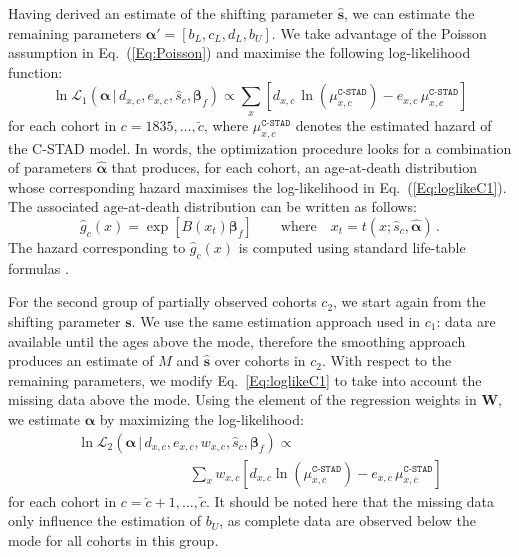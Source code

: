 \documentclass[11pt, a4paper]{article}
\begin{document}
Having derived an estimate of the shifting parameter $\hat{\bm{s}}$, we can estimate the remaining parameters $\bm{\alpha}'=\left[b_{L},c_{L},d_{L},b_{U}\right]$. We take advantage of the Poisson assumption in Eq.~(\ref{Eq:Poisson}) and maximise the following log-likelihood function:
%
\begin{equation}\label{Eq:loglikeC1}
\ln\mathcal{L}_1\left(\bm{\alpha}\,|\,d_{x,c} , e_{x,c} , \hat{s}_{c}, \bm{\beta}_{f}
\right) \propto \sum_{x} \left[  d_{x,c} \,
\ln \left( \mu^{\texttt{C-STAD}}_{x,c}  \right) - e_{x,c}
\, \mu^{\texttt{C-STAD}}_{x,c} \right] 
\end{equation}
%
for each cohort in $c = 1835,\ldots,\breve{c}$, where $\mu^{\texttt{C-STAD}}_{x,c}$ denotes the estimated hazard of the C-STAD model. In words, the optimization procedure looks for a combination of parameters $\hat{\bm{\alpha}}$ that produces, for each cohort, an age-at-death distribution
whose corresponding hazard maximises the log-likelihood in Eq.~(\ref{Eq:loglikeC1}). The associated age-at-death distribution can be written as follows:
\begin{equation}\label{eq:gBspl}
\hat{g}_{c}(x) = \exp\left[ B(x_{t}) \bm{\beta}_{f} \right] \qquad \mbox{where} \quad x_{t} = t(x; \hat{s}_{c},\hat{\bm{\alpha}}) \, .
\end{equation}
The hazard corresponding to $\hat{g}_{c}(x)$ is computed using standard life-table formulas \citep{preston2001demogr}.

For the second group of partially observed cohorts $c_2$, we start again from the shifting parameter $\bm{s}$. We use the same estimation approach used in $c_1$: data are available until the ages above the mode, therefore the smoothing approach produces an estimate of $M$ and $\hat{\bm{s}}$ over cohorts in $c_2$. With respect to the remaining parameters, we modify Eq.~\eqref{Eq:loglikeC1} to take into account the missing data above the mode. Using the element of the regression weights in $\bm{W}$, we estimate $\bm{\alpha}$ by maximizing the log-likelihood:
%
\begin{equation}\label{Eq:loglikeC2}
\begin{aligned}
\ln\mathcal{L}_2\left(\bm{\alpha}\,|\,d_{x,c} , e_{x,c} , w_{x,c} , \hat{s}_{c}, \bm{\beta}_{f}
\right) \propto \qquad\qquad\qquad\qquad \\ \qquad\qquad\qquad\qquad \sum_{x} w_{x,c} \left[  d_{x,c} \ln\left( \mu^{\texttt{C-STAD}}_{x,c}  \right) - e_{x,c}
\, \mu^{\texttt{C-STAD}}_{x,c} \right] 
\end{aligned}
\end{equation}
%
for each cohort in $c=\breve{c}+1,\ldots,\tilde{c}$. It should be noted here that the missing data only influence the estimation of $b_U$, as complete data are observed below the mode for all cohorts in this group. 
\end{document}
